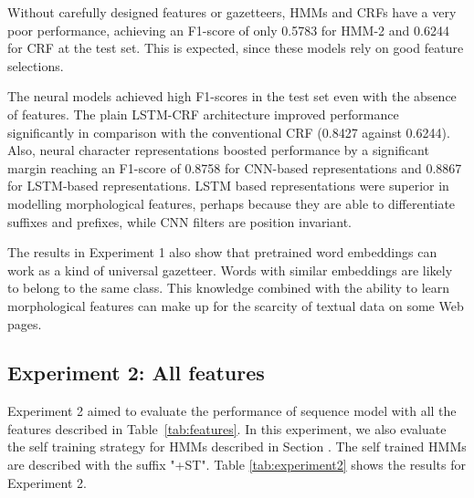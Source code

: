 \documentclass{nle}
\begin{document}
Without carefully designed features or gazetteers, HMMs and CRFs have a very 
poor performance, achieving an F1-score of only 0.5783 for HMM-2 and 0.6244 for CRF
at the test set. This is expected, since these models rely on good feature selections.

The neural models achieved high F1-scores in the test
set even with the absence of features. The plain LSTM-CRF architecture improved performance 
significantly in comparison with the conventional CRF (0.8427 against 0.6244). 
Also, neural character representations boosted performance by a significant margin
reaching an F1-score of 0.8758 for CNN-based representations and 0.8867 for LSTM-based
representations. LSTM based representations were superior in modelling
morphological features, perhaps because they are able to differentiate suffixes 
and prefixes, while CNN filters are position invariant. 

The results in Experiment 1 also show that pretrained word embeddings can work 
as a kind of universal gazetteer. Words with similar embeddings are likely to 
belong to the same class. This knowledge combined with the ability to learn 
morphological features can make up for the scarcity of textual data on some 
Web pages.

\subsection{Experiment 2: All features}

Experiment 2 aimed to evaluate the performance of sequence model with all
the features described in Table~\ref{tab:features}. In this experiment, we
also evaluate the self training strategy for HMMs described in Section 
\label{sssec:self_training}. The self trained HMMs are described with the 
suffix "+ST". Table \ref{tab:experiment2} shows the results for Experiment 2.
\end{document}
